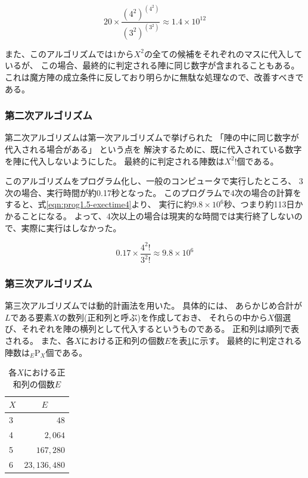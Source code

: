 \begin{equation} \label{eqn:prog1-exectime4}
20 \times \frac{(4^2)^{(4^2)}}{(3^2)^{(3^2)}} \approx 1.4 \times 10^{12}
\end{equation}

また、このアルゴリズムでは$1$から$X^2$の全ての候補をそれぞれのマスに代入しているが、
この場合、最終的に判定される陣に同じ数字が含まれることもある。
これは魔方陣の成立条件に反しており明らかに無駄な処理なので、改善すべきである。


\subsubsection{第二次アルゴリズム}
第二次アルゴリズムは第一次アルゴリズムで挙げられた
「陣の中に同じ数字が代入される場合がある」
という点を
解決するために、既に代入されている数字を陣に代入しないようにした。
最終的に判定される陣数は$X^2!$個である。

このアルゴリズムをプログラム化し、一般のコンピュータで実行したところ、
3次の場合、実行時間が約0.17秒となった。
このプログラムで4次の場合の計算をすると、式\ref{eqn:prog1.5-exectime4}より、
実行に約$9.8 \times 10^6$秒、つまり約113日かかることになる。
よって、4次以上の場合は現実的な時間では実行終了しないので、実際に実行はしなかった。

\begin{equation} \label{eqn:prog1.5-exectime4}
0.17 \times \frac{4^2!}{3^2!} \approx 9.8 \times 10^6
\end{equation}

\subsubsection{第三次アルゴリズム}
第三次アルゴリズムでは動的計画法を用いた。
具体的には、
あらかじめ合計が$L$である要素$X$の数列(正和列と呼ぶ)を作成しておき、
それらの中から$X$個選び、それぞれを陣の横列として代入するというものである。
正和列は順列で表される。
また、各$X$における正和列の個数$E$を表\ref{tab:ple-each-X}に示す。
最終的に判定される陣数は$_E \mathrm{P} _X$個である。

\begin{table}[htb]
	\begin{center}
	\begin{tabular}{|l|r|}
\hline \hline
\multicolumn{1}{|c|}{$X$} & \multicolumn{1}{|c|}{$E$} \\
\hline \hline
3 & $48$ \\
4 & $2,064$ \\
5 & $167,280$ \\
6 & $23,136,480$ \\
\hline
	\end{tabular}
	\end{center}
	\caption{各$X$における正和列の個数$E$}
	\label{tab:ple-each-X}
\end{table}


